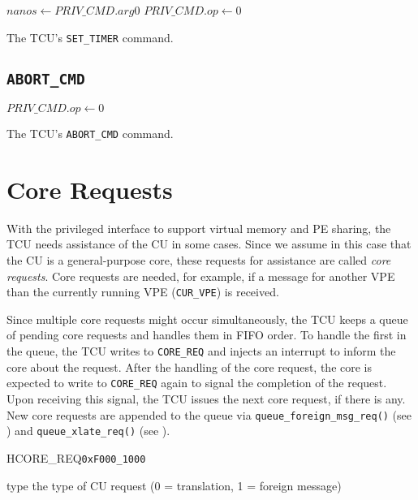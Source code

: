 \begin{algorithm}[H]
    $nanos \gets PRIV\_CMD.arg0$\;
    \BlankLine
    $PRIV\_CMD.op \gets 0$\;
    \caption{The TCU's \texttt{SET\_TIMER} command.}
\end{algorithm}

\subsection{\texttt{ABORT\_CMD}}

\begin{algorithm}[H]
    \BlankLine
    $PRIV\_CMD.op \gets 0$\;
    \caption{The TCU's \texttt{ABORT\_CMD} command.}
\end{algorithm}
\extend{}

\section{Core Requests}

With the privileged interface to support virtual memory and PE sharing, the TCU needs assistance of
the CU in some cases. Since we assume in this case that the CU is a general-purpose core, these
requests for assistance are called \emph{core requests}. Core requests are needed, for example, if a
message for another VPE than the currently running VPE (\texttt{CUR\_VPE}) is received.

Since multiple core requests might occur simultaneously, the TCU keeps a queue of pending core
requests and handles them in FIFO order. To handle the first in the queue, the TCU writes to
\texttt{CORE\_REQ} and injects an interrupt to inform the core about the request. After the handling
of the core request, the core is expected to write to \texttt{CORE\_REQ} again to signal the
completion of the request. Upon receiving this signal, the TCU issues the next core request, if
there is any. New core requests are appended to the queue via \texttt{queue\_foreign\_msg\_req()}
(see ) and \texttt{queue\_xlate\_req()} (see ).

\begin{register}{H}{CORE\_REQ}{\texttt{0xF000\_1000}}
  \regnewline%
  \begin{regdesc}\begin{reglist}
    \item[type] the type of CU request (0 = translation, 1 = foreign message)
  \end{reglist}\end{regdesc}
\end{register}

